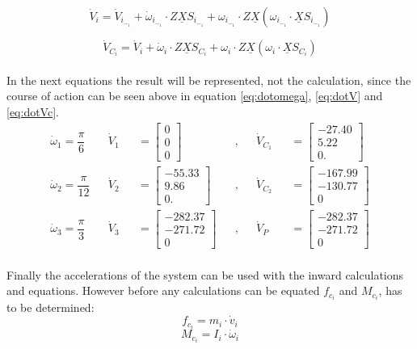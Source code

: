 \begin{equation}\label{eq:dotV}
\dot{V}_i=\dot{V}_i_-_1+\dot\omega_i_-_1\cdot Z\underline{X}S_i_-_1+\omega_i_-_1\cdot Z\underline{X}(\omega_i_-_1\cdot\underline{X}S_i_-_1)
\end{equation}

\begin{equation}\label{eq:dotVc}
\dot{V}_C_i=\dot{V}_i+\dot\omega_i\cdot Z\underline{X}S_C_i+\omega_i\cdot Z\underline{X}(\omega_i\cdot\underline{X}S_C_i)
\end{equation}
\\
In the next equations the result will be represented, not the calculation, since the course of action can be seen above in equation \ref{eq:dotomega}, \ref{eq:dotV} and \ref{eq:dotVc}.\\

\begin{align}
\dot\omega_1=\dfrac{\pi}{6}&&
    \dot{V}_1&&=
\left[\begin{matrix}
    0\\
    0\\
    0
\end{matrix}\right]&&,&&\dot{V}_C_1&&=\left[\begin{matrix}
    -27.40\\
    5.22\\
    0.
\end{matrix}\right]\\
\dot\omega_2=\dfrac{\pi}{12}&&
    \dot{V}_2&&=
\left[\begin{matrix}
    -55.33\\
    9.86\\
    0.
\end{matrix}\right]&&,&& \dot{V}_C_2&&=
\left[\begin{matrix}
   -167.99 \\
   -130.77\\
    0
\end{matrix}\right]\\
\dot\omega_3=\dfrac{\pi}{3}&&
    \Dot{V}_3&&=
\left[\begin{matrix}
    -282.37\\
    -271.72\\
    0
\end{matrix}\right]&&,&& \dot{V}_P&&=\left[\begin{matrix}
    -282.37\\
    -271.72\\
    0
\end{matrix}\right]
\end{align}
\\
\noindent
Finally the accelerations of the system can be used with the inward calculations and equations. However before any calculations can be equated $f_c_i$ and $M_c_i$, has to be determined:\\
\begin{equation}\label{eq:fci}
    f_c_i=m_i\cdot \Dot{v}_i
\end{equation} 
\begin{equation}\label{eq:Mi}
    M_c_i=I_i\cdot \Dot{\omega}_i
\end{equation}


